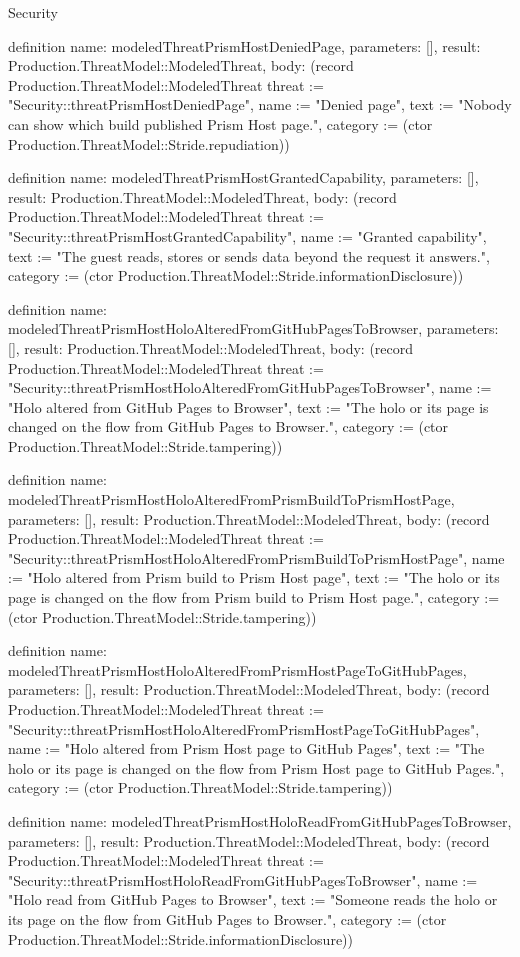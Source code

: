 \begin{lexlean}{Security}
\begin{semanticmodule}
definition{
  name: modeledThreatPrismHostDeniedPage,
  parameters: [],
  result: Production.ThreatModel::ModeledThreat,
  body: (record Production.ThreatModel::ModeledThreat {threat := "Security::threatPrismHostDeniedPage", name := "Denied page", text := "Nobody can show which build published Prism Host page.", category := (ctor Production.ThreatModel::Stride.repudiation)})
}

definition{
  name: modeledThreatPrismHostGrantedCapability,
  parameters: [],
  result: Production.ThreatModel::ModeledThreat,
  body: (record Production.ThreatModel::ModeledThreat {threat := "Security::threatPrismHostGrantedCapability", name := "Granted capability", text := "The guest reads, stores or sends data beyond the request it answers.", category := (ctor Production.ThreatModel::Stride.informationDisclosure)})
}

definition{
  name: modeledThreatPrismHostHoloAlteredFromGitHubPagesToBrowser,
  parameters: [],
  result: Production.ThreatModel::ModeledThreat,
  body: (record Production.ThreatModel::ModeledThreat {threat := "Security::threatPrismHostHoloAlteredFromGitHubPagesToBrowser", name := "Holo altered from GitHub Pages to Browser", text := "The holo or its page is changed on the flow from GitHub Pages to Browser.", category := (ctor Production.ThreatModel::Stride.tampering)})
}

definition{
  name: modeledThreatPrismHostHoloAlteredFromPrismBuildToPrismHostPage,
  parameters: [],
  result: Production.ThreatModel::ModeledThreat,
  body: (record Production.ThreatModel::ModeledThreat {threat := "Security::threatPrismHostHoloAlteredFromPrismBuildToPrismHostPage", name := "Holo altered from Prism build to Prism Host page", text := "The holo or its page is changed on the flow from Prism build to Prism Host page.", category := (ctor Production.ThreatModel::Stride.tampering)})
}

definition{
  name: modeledThreatPrismHostHoloAlteredFromPrismHostPageToGitHubPages,
  parameters: [],
  result: Production.ThreatModel::ModeledThreat,
  body: (record Production.ThreatModel::ModeledThreat {threat := "Security::threatPrismHostHoloAlteredFromPrismHostPageToGitHubPages", name := "Holo altered from Prism Host page to GitHub Pages", text := "The holo or its page is changed on the flow from Prism Host page to GitHub Pages.", category := (ctor Production.ThreatModel::Stride.tampering)})
}

definition{
  name: modeledThreatPrismHostHoloReadFromGitHubPagesToBrowser,
  parameters: [],
  result: Production.ThreatModel::ModeledThreat,
  body: (record Production.ThreatModel::ModeledThreat {threat := "Security::threatPrismHostHoloReadFromGitHubPagesToBrowser", name := "Holo read from GitHub Pages to Browser", text := "Someone reads the holo or its page on the flow from GitHub Pages to Browser.", category := (ctor Production.ThreatModel::Stride.informationDisclosure)})
}


\end{semanticmodule}
\end{lexlean}
